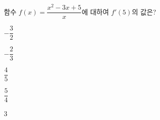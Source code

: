 함수 $f(x)=\dfrac{x^2-3x+5}{x}$에 대하여 $f'(5)$의 값은?
\begin{choices32}{\rule[-3ex]{0pt}{8ex}$-\dfrac{3}{2}$}{\rule[-3ex]{0pt}{8ex}$-\dfrac{2}{3}$}{\rule[-3ex]{0pt}{8ex}$\dfrac{4}{5}$}{\rule[-3ex]{0pt}{8ex}$\dfrac{5}{4}$}{\rule[-3ex]{0pt}{8ex}$3$}\end{choices32}
